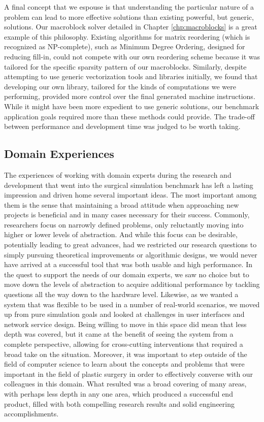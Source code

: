 A final concept that we espouse is that understanding the particular
nature of a problem can lead to more effective solutions than existing
powerful, but generic, solutions. Our macroblock solver detailed in
Chapter \ref{chp:macroblocks} is a great example of this
philosophy. Existing algorithms for matrix reordering (which is
recognized as NP-complete), such as Minimum Degree Ordering, designed
for reducing fill-in, could not compete with our own reordering scheme
because it was tailored for the specific sparsity pattern of our
macroblocks. Similarly, despite attempting to use generic
vectorization tools and libraries initially, we found that developing
our own library, tailored for the kinds of computations we were
performing, provided more control over the final generated machine
instructions. While it might have been more expedient to use generic
solutions, our benchmark application goals required more than these
methods could provide. The trade-off between performance and
development time was judged to be worth taking.

\subsection{Domain Experiences}

The experiences of working with domain experts during the research and
development that went into the surgical simulation benchmark has left
a lasting impression and driven home several important ideas. The most
important among them is the sense that maintaining a broad attitude
when approaching new projects is beneficial and in many cases
necessary for their success. Commonly, researchers focus on narrowly
defined problems, only reluctantly moving into higher or lower levels
of abstraction. And while this focus can be desirable, potentially
leading to great advances, had we restricted our research questions to
simply pursuing theoretical improvements or algorithmic designs, we
would never have arrived at a successful tool that was both usable and
high performance. In the quest to support the needs of our domain
experts, we saw no choice but to move down the levels of abstraction
to acquire additional performance by tackling questions all the way
down to the hardware level. Likewise, as we wanted a system that was
flexible to be used in a number of real-world scenarios, we moved up
from pure simulation goals and looked at challenges in user interfaces
and network service design. Being willing to move in this space did
mean that less depth was covered, but it came at the benefit of seeing
the system from a complete perspective, allowing for cross-cutting
interventions that required a broad take on the situation. Moreover,
it was important to step outside of the field of computer science to
learn about the concepts and problems that were important in the field
of plastic surgery in order to effectively converse with our
colleagues in this domain. What resulted was a broad covering of many
areas, with perhaps less depth in any one area, which produced a
successful end product, filled with both compelling research results
and solid engineering accomplishments.

